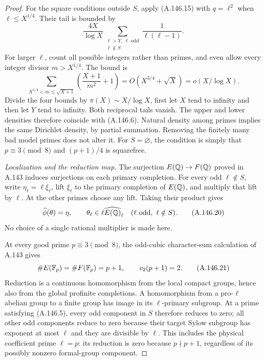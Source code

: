\begin{proof}
For the square conditions outside \(S\), apply (A.146.15)
with \(q=\ell^2\) when \(\ell\le X^{1/4}\).
Their tail is bounded by
\[
                 \frac{4X}{\log X}
                 \sum_{\substack{\ell>Y,\ \ell\text{ odd}\\\ell\notin S}}
                              \frac1{\ell(\ell-1)}.
\tag{A.146.18}
\]
For larger \(\ell\), count all possible integers rather than
primes, and even allow every integer divisor \(m>X^{1/4}\).
The bound is
\[
 \sum_{X^{1/4}<m\le\sqrt{X+1}}
                   \left(\frac{X+1}{m^2}+1\right)
                  =O(X^{3/4}+\sqrt X)=o(X/\log X).
\tag{A.146.19}
\]
Divide the four bounds by \(\pi(X)\sim X/\log X\),
first let \(X\) tend to infinity and then let \(Y\) tend
to infinity.  Both reciprocal tails vanish.
The upper and lower densities therefore coincide with
(A.146.6).  Natural density among primes implies the same
Dirichlet density, by partial summation.
Removing the finitely many bad model primes does not alter it.
For \(S=\varnothing\), the condition is simply that
\(p\equiv3\pmod8\) and \((p+1)/4\) is squarefree.

\emph{Localization and the reduction map.}
The surjection \(E(\mathbb Q)\to F(\mathbb Q)\) proved in A.143 induces
surjections on each primary completion.
For every odd \(\ell\notin S\), write
\(\eta_\ell=\ell\xi_\ell\), lift \(\xi_\ell\) to the
primary completion of \(E(\mathbb Q)\), and multiply that lift by
\(\ell\).  At the other primes choose any lift.
Taking their product gives
\[
 \widehat\phi(\theta)=\eta,\qquad
 \theta_\ell\in\ell\widehat{E(\mathbb Q)}_\ell
                    \quad(\ell\text{ odd},\ \ell\notin S).
\tag{A.146.20}
\]
No choice of a single rational multiplier is made here.

At every good prime \(p\equiv3\pmod8\), the odd-cubic
character-sum calculation of A.143 gives
\[
                \#E(\mathbb F_p)=\#F(\mathbb F_p)=p+1,
                   \qquad v_2(p+1)=2.
\tag{A.146.21}
\]
Reduction is a continuous homomorphism from the local compact
groups, hence also from the global profinite completions.
A homomorphism from a pro-\(\ell\) abelian group to a finite
group has image in its \(\ell\)-primary subgroup.
At a prime satisfying (A.146.5), every odd component in
\(S\) therefore reduces to zero; all other odd components
reduce to zero because their target Sylow subgroup has
exponent at most \(\ell\) and they are divisible by \(\ell\).
This includes the physical coefficient prime \(\ell=p\):
its reduction is zero because \(p\nmid p+1\), regardless
of its possibly nonzero formal-group component.


\end{proof}
